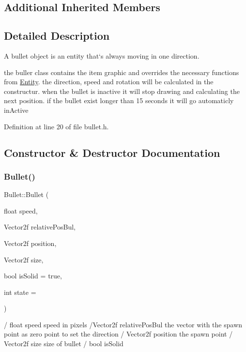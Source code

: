 \subsection*{Additional Inherited Members}


\subsection{Detailed Description}
A bullet object is an entity that`s always moving in one direction. 

the buller class contains the item graphic and overrides the necessary functions from \hyperlink{class_entity}{Entity}. the direction, speed and rotation will be calculated in the constructur. when the bullet is inactive it will stop drawing and calculating the next position. if the bullet exist longer than 15 seconds it will go automaticly in\+Active 

Definition at line 20 of file bullet.\+h.



\subsection{Constructor \& Destructor Documentation}
\mbox{\label{class_bullet_a33aa7037c020e72ea614356dc1f7e67b}} 
\subsubsection{\texorpdfstring{Bullet()}{Bullet()}}
{\footnotesize\ttfamily Bullet\+::\+Bullet (\begin{DoxyParamCaption}\item[{float}]{speed,  }\item[{Vector2f}]{relative\+Pos\+Bul,  }\item[{Vector2f}]{position,  }\item[{Vector2f}]{size,  }\item[{bool}]{is\+Solid = {\ttfamily true},  }\item[{int}]{state = {} }\end{DoxyParamCaption})}

/ float speed speed in pixels /\+Vector2f relative\+Pos\+Bul the vector with the spawn point as zero point to set the direction / Vector2f position the spawn point / Vector2f size size of bullet / bool is\+Solid 

